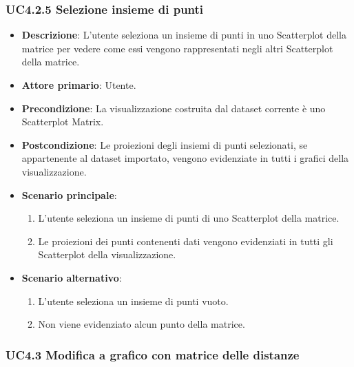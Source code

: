 \subsubsection{UC4.2.5 Selezione insieme di punti}
\label{ssub:uc4.2.5}
\begin{itemize}
    \item \textbf{Descrizione}: L'utente seleziona un insieme di punti in uno Scatterplot della matrice per vedere come 
                                essi vengono rappresentati negli altri Scatterplot della matrice.
	
    \item \textbf{Attore primario}: Utente.
    
    \item \textbf{Precondizione}:   La visualizzazione costruita dal dataset corrente è uno Scatterplot Matrix.
    \item \textbf{Postcondizione}:  Le proiezioni degli insiemi di punti selezionati, se appartenente al dataset importato, 
                                    vengono evidenziate in tutti i grafici della visualizzazione.

	\item \textbf{Scenario principale}:
        \begin{enumerate}
            \item L'utente seleziona un insieme di punti di uno Scatterplot della matrice.
            \item Le proiezioni dei punti contenenti dati vengono evidenziati in tutti gli Scatterplot della visualizzazione.
        \end{enumerate}

    \item \textbf{Scenario alternativo}:
        \begin{enumerate}
            \item L'utente seleziona un insieme di punti vuoto.
            \item Non viene evidenziato alcun punto della matrice.
        \end{enumerate}

\end{itemize}

\newpage
\subsubsection{UC4.3 Modifica a grafico con matrice delle distanze}
\label{ssub:uc4.3}

